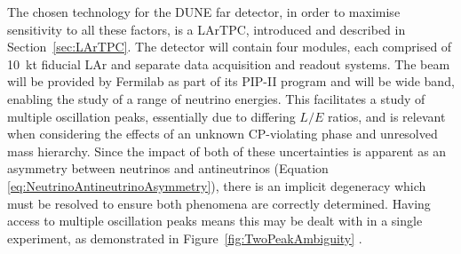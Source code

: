 The chosen technology for the DUNE far detector, in order to maximise sensitivity to all these factors, is a LArTPC, introduced and described in Section~\ref{sec:LArTPC}.  The detector will contain four modules, each comprised of 10~kt fiducial LAr and separate data acquisition and readout systems.  The beam will be provided by Fermilab as part of its PIP-II program \cite{PIPII2013} and will be wide band, enabling the study of a range of neutrino energies.  This facilitates a study of multiple oscillation peaks, essentially due to differing $L/E$ ratios, and is relevant when considering the effects of an unknown CP-violating phase and unresolved mass hierarchy.  Since the impact of both of these uncertainties is apparent as an asymmetry between neutrinos and antineutrinos (Equation \ref{eq:NeutrinoAntineutrinoAsymmetry}), there is an implicit degeneracy which must be resolved to ensure both phenomena are correctly determined.  Having access to multiple oscillation peaks means this may be dealt with in a single experiment, as demonstrated in Figure~\ref{fig:TwoPeakAmbiguity} \cite{Huber2011}.


